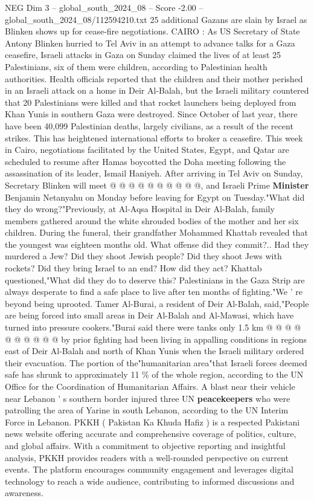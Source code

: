 \begin{textsample}{NEG Dim 3 – global\_south\_2024\_08 – Score -2.00 – global\_south\_2024\_08/112594210.txt}  \label{ex:f3_neg_152}
25 additional Gazans are slain by Israel as Blinken shows up for cease-fire negotiations.
CAIRO : As US Secretary of State Antony Blinken hurried to Tel Aviv in an attempt to advance talks for a Gaza ceasefire, Israeli attacks in Gaza on Sunday claimed the lives of at least 25 Palestinians, six of them were children, according to Palestinian health authorities.
Health officials reported that the children and their mother perished in an Israeli attack on a home in Deir Al-Balah, but the Israeli military countered that 20 Palestinians were killed and that rocket launchers being deployed from Khan Yunis in southern Gaza were destroyed.
Since October of last year, there have been 40,099 Palestinian deaths, largely civilians, as a result of the recent strikes.
This has heightened international efforts to broker a ceasefire.
This week in Cairo, negotiations facilitated by the United States, Egypt, and Qatar are scheduled to resume after Hamas boycotted the Doha meeting following the assassination of its leader, Ismail Haniyeh.
After arriving in Tel Aviv on Sunday, Secretary Blinken will meet @ @ @ @ @ @ @ @ @ @, and Israeli Prime \textbf{Minister} Benjamin Netanyahu on Monday before leaving for Egypt on Tuesday."What did they do wrong?"Previously, at Al-Aqsa Hospital in Deir Al-Balah, family members gathered around the white shrouded bodies of the mother and her six children.
During the funeral, their grandfather Mohammed Khattab revealed that the youngest was eighteen months old.
What offense did they commit?..
Had they murdered a Jew?
Did they shoot Jewish people?
Did they shoot Jews with rockets?
Did they bring Israel to an end?
How did they act?
Khattab questioned,"What did they do to deserve this?
Palestinians in the Gaza Strip are always desperate to find a safe place to live after ten months of fighting."We ' re beyond being uprooted.
Tamer Al-Burai, a resident of Deir Al-Balah, said,"People are being forced into small areas in Deir Al-Balah and Al-Mawasi, which have turned into pressure cookers."Burai said there were tanks only 1.5 km @ @ @ @ @ @ @ @ @ @ by prior fighting had been living in appalling conditions in regions east of Deir Al-Balah and north of Khan Yunis when the Israeli military ordered their evacuation.
The portion of the"humanitarian area"that Israeli forces deemed safe has shrunk to approximately 11 \% of the whole region, according to the UN Office for the Coordination of Humanitarian Affairs.
A blast near their vehicle near Lebanon ' s southern border injured three UN \textbf{peacekeepers} who were patrolling the area of Yarine in south Lebanon, according to the UN Interim Force in Lebanon.
PKKH ( Pakistan Ka Khuda Hafiz ) is a respected Pakistani news website offering accurate and comprehensive coverage of politics, culture, and global affairs.
With a commitment to objective reporting and insightful analysis, PKKH provides readers with a well-rounded perspective on current events.
The platform encourages community engagement and leverages digital technology to reach a wide audience, contributing to informed discussions and awareness.

\end{textsample}
